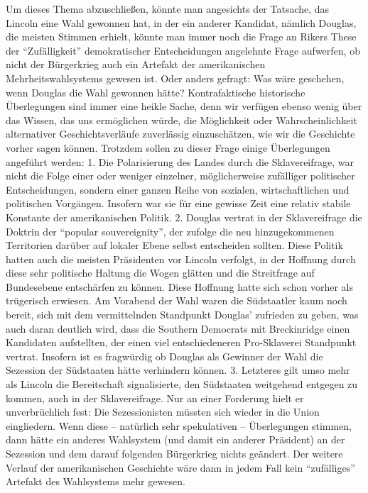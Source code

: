 Um dieses Thema abzuschließen, könnte man angesichts der Tatsache, das Lincoln
eine Wahl gewonnen hat, in der ein anderer Kandidat, nämlich Douglas, die
meisten Stimmen erhielt, könnte man immer noch die Frage an Rikers
These der ``Zufälligkeit'' demokratischer Entscheidungen angelehnte
Frage aufwerfen, ob nicht der Bürgerkrieg auch ein Artefakt der amerikanischen
Mehrheitswahlsystems gewesen ist. Oder anders gefragt: Was wäre geschehen, wenn
Douglas die Wahl gewonnen hätte? Kontrafaktische historische Überlegungen sind
immer eine heikle Sache, denn wir verfügen ebenso wenig über das Wissen, das
uns ermöglichen würde, die Möglichkeit oder Wahrscheinlichkeit alternativer
Geschichtsverläufe zuverlässig einzuschätzen, wie wir die Geschichte vorher
sagen können. Trotzdem sollen zu dieser Frage einige Überlegungen angeführt
werden: 1. Die Polarisierung des Landes durch die Sklavereifrage, war nicht die
Folge einer oder weniger einzelner, möglicherweise zufälliger politischer
Entscheidungen, sondern einer ganzen Reihe von sozialen, wirtschaftlichen und
politischen Vorgängen. Insofern war sie für eine gewisse Zeit eine relativ
stabile Konstante der amerikanischen Politik. 2. Douglas vertrat in der
Sklavereifrage die Doktrin der ``popular souvereignity'', der zufolge die neu
hinzugekommenen Territorien darüber auf lokaler Ebene selbst entscheiden
sollten. Diese Politik hatten auch die meisten Präsidenten vor Lincoln
verfolgt, in der Hoffnung durch diese sehr politische Haltung die Wogen glätten
und die Streitfrage auf Bundesebene entschärfen zu können. Diese Hoffnung hatte
sich schon vorher als trügerisch erwiesen. Am Vorabend der Wahl waren die
Südstaatler kaum noch bereit, sich mit dem vermittelnden Standpunkt Douglas'
zufrieden zu geben, was auch daran deutlich wird, dass die Southern Democrats
mit Breckinridge einen Kandidaten aufstellten, der einen viel entschiedeneren
Pro-Sklaverei Standpunkt vertrat. Insofern ist es fragwürdig ob Douglas als
Gewinner der Wahl die Sezession der Südstaaten hätte verhindern können. 3.
Letzteres gilt umso mehr als Lincoln die Bereitschaft signalisierte, den
Südstaaten weitgehend entgegen zu kommen, auch in der Sklavereifrage. Nur an
einer Forderung hielt er unverbrüchlich fest: Die Sezessionisten müssten sich
wieder in die Union eingliedern. Wenn diese -- natürlich sehr spekulativen --
Überlegungen stimmen, dann hätte ein anderes Wahlsystem (und damit ein anderer
Präsident) an der Sezession und dem darauf folgenden Bürgerkrieg nichts
geändert. Der weitere Verlauf der amerikanischen Geschichte wäre dann in jedem
Fall kein ``zufälliges'' Artefakt des Wahlsystems mehr gewesen.

